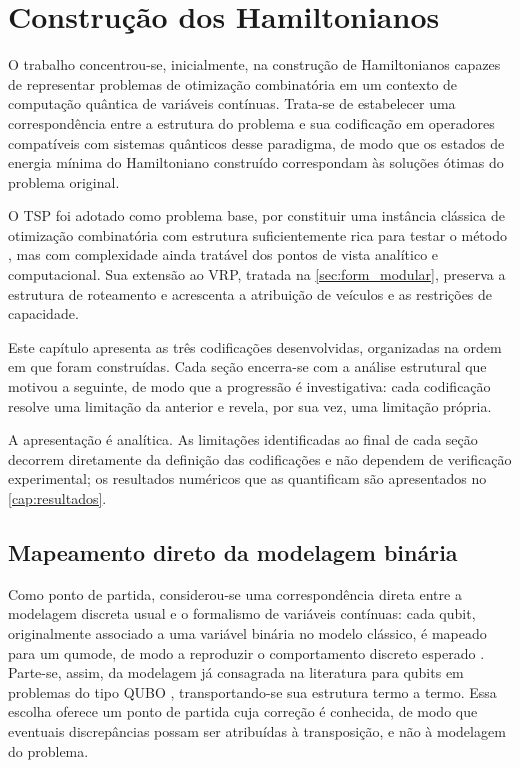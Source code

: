 \chapter{Construção dos Hamiltonianos}\label{cap:formulacao}

    O trabalho concentrou-se, inicialmente, na construção de Hamiltonianos capazes de representar problemas de otimização combinatória em um contexto de computação quântica de variáveis contínuas. Trata-se de estabelecer uma correspondência entre a estrutura do problema e sua codificação em operadores compatíveis com sistemas quânticos desse paradigma, de modo que os estados de energia mínima do Hamiltoniano construído correspondam às soluções ótimas do problema original.

    O TSP foi adotado como problema base, por constituir uma instância clássica de otimização combinatória com estrutura suficientemente rica para testar o método \cite{hartmanis1982computers}, mas com complexidade ainda tratável dos pontos de vista analítico e computacional. Sua extensão ao VRP, tratada na \autoref{sec:form_modular}, preserva a estrutura de roteamento e acrescenta a atribuição de veículos e as restrições de capacidade.

    Este capítulo apresenta as três codificações desenvolvidas, organizadas na ordem em que foram construídas. Cada seção encerra-se com a análise estrutural que motivou a seguinte, de modo que a progressão é investigativa: cada codificação resolve uma limitação da anterior e revela, por sua vez, uma limitação própria.

    A apresentação é analítica. As limitações identificadas ao final de cada seção decorrem diretamente da definição das codificações e não dependem de verificação experimental; os resultados numéricos que as quantificam são apresentados no \autoref{cap:resultados}.


\section{Mapeamento direto da modelagem binária}\label{sec:form_qubo}

    Como ponto de partida, considerou-se uma correspondência direta entre a modelagem discreta usual e o formalismo de variáveis contínuas: cada qubit, originalmente associado a uma variável binária no modelo clássico, é mapeado para um qumode, de modo a reproduzir o comportamento discreto esperado \cite{verdon2019quantum}. Parte-se, assim, da modelagem já consagrada na literatura para qubits em problemas do tipo QUBO \cite{lucas2014ising}, transportando-se sua estrutura termo a termo. Essa escolha oferece um ponto de partida cuja correção é conhecida, de modo que eventuais discrepâncias possam ser atribuídas à transposição, e não à modelagem do problema.

